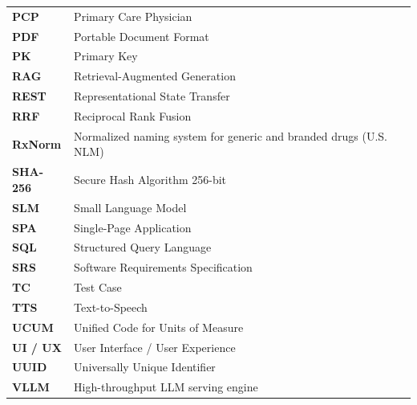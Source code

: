 \begin{longtable}{@{}p{} p{}@{}}
\textbf{PCP} & Primary Care Physician \\
\textbf{PDF} & Portable Document Format \\
\textbf{PK} & Primary Key \\
\textbf{RAG} & Retrieval-Augmented Generation \\
\textbf{REST} & Representational State Transfer \\
\textbf{RRF} & Reciprocal Rank Fusion \\
\textbf{RxNorm} & Normalized naming system for generic and branded drugs (U.S. NLM) \\
\textbf{SHA-256} & Secure Hash Algorithm 256-bit \\
\textbf{SLM} & Small Language Model \\
\textbf{SPA} & Single-Page Application \\
\textbf{SQL} & Structured Query Language \\
\textbf{SRS} & Software Requirements Specification \\
\textbf{TC} & Test Case \\
\textbf{TTS} & Text-to-Speech \\
\textbf{UCUM} & Unified Code for Units of Measure \\
\textbf{UI / UX} & User Interface / User Experience \\
\textbf{UUID} & Universally Unique Identifier \\
\textbf{VLLM} & High-throughput LLM serving engine \\
\end{longtable}
